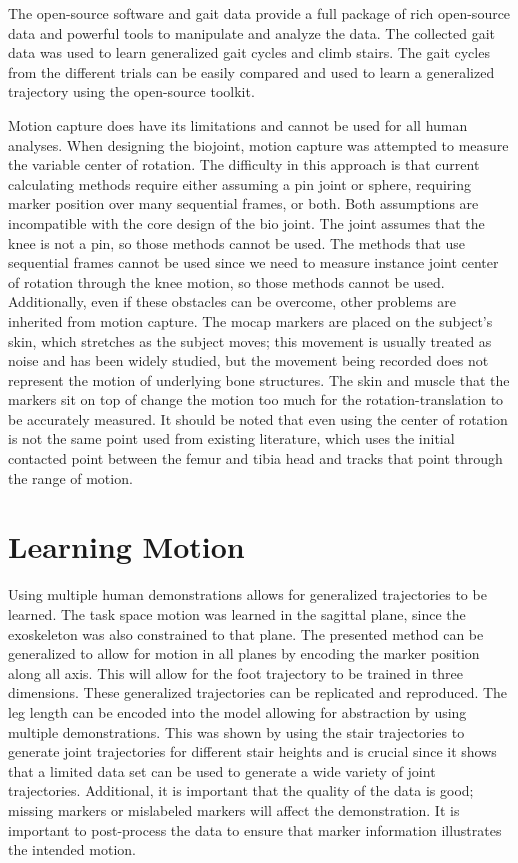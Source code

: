 The open-source software and gait data provide a full package of rich open-source data and powerful tools to manipulate and analyze the data. The collected gait data was used to learn generalized gait cycles and climb stairs. The gait cycles from the different trials can be easily compared and used to learn a generalized trajectory using the open-source toolkit. 

Motion capture does have its limitations and cannot be used for all human analyses. When designing the biojoint, motion capture was attempted to measure the variable center of rotation. The difficulty in this approach is that current calculating methods require either assuming a pin joint or sphere, requiring marker position over many sequential frames, or both. Both assumptions are incompatible with the core design of the bio joint. The joint assumes that the knee is not a pin, so those methods cannot be used. The methods that use sequential frames cannot be used since we need to measure instance joint center of rotation through the knee motion, so those methods cannot be used. Additionally, even if these obstacles can be overcome, other problems are inherited from motion capture. The mocap markers are placed on the subject's skin, which stretches as the subject moves; this movement is usually treated as noise and has been widely studied, but the movement being recorded does not represent the motion of underlying bone structures. The skin and muscle that the markers sit on top of change the motion too much for the rotation-translation to be accurately measured. It should be noted that even using the center of rotation is not the same point used from existing literature, which uses the initial contacted point between the femur and tibia head and tracks that point through the range of motion.



\section{Learning Motion}


Using multiple human demonstrations allows for generalized trajectories to be learned. The task space motion was learned in the sagittal plane, since the exoskeleton was also constrained to that plane. The presented method can be generalized to allow for motion in all planes by encoding the marker position along all axis. This will allow for the foot trajectory to be trained in three dimensions. These generalized trajectories can be replicated and reproduced. The leg length can be encoded into the model allowing for abstraction by using multiple demonstrations. This was shown by using the stair trajectories to generate joint trajectories for different stair heights and is crucial since it shows that a limited data set can be used to generate a wide variety of joint trajectories. Additional, it is important that the quality of the data is good; missing markers or mislabeled markers will affect the demonstration. It is important to post-process the data to ensure that marker information illustrates the intended motion. 

